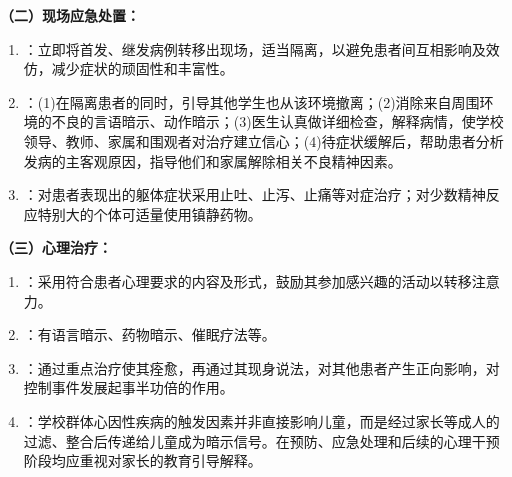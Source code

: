\begin{keybox}
\textbf{（二）现场应急处置：}
\begin{enumerate}[leftmargin=*]
    \item {}：立即将首发、继发病例转移出现场，适当隔离，以避免患者间互相影响及效仿，减少症状的顽固性和丰富性。
    \item {}：(1)在隔离患者的同时，引导其他学生也从该环境撤离；(2)消除来自周围环境的不良的言语暗示、动作暗示；(3)医生认真做详细检查，解释病情，使学校领导、教师、家属和围观者对治疗建立信心；(4)待症状缓解后，帮助患者分析发病的主客观原因，指导他们和家属解除相关不良精神因素。
    \item {}：对患者表现出的躯体症状采用止吐、止泻、止痛等对症治疗；对少数精神反应特别大的个体可适量使用镇静药物。
\end{enumerate}

\textbf{（三）心理治疗：}
\begin{enumerate}[leftmargin=*]
    \item {}：采用符合患者心理要求的内容及形式，鼓励其参加感兴趣的活动以转移注意力。
    \item {}：有语言暗示、药物暗示、催眠疗法等。
    \item {}：通过重点治疗使其痊愈，再通过其现身说法，对其他患者产生正向影响，对控制事件发展起事半功倍的作用。
    \item {}：学校群体心因性疾病的触发因素并非直接影响儿童，而是经过家长等成人的过滤、整合后传递给儿童成为暗示信号。在预防、应急处理和后续的心理干预阶段均应重视对家长的教育引导解释。
\end{enumerate}
\end{keybox}

\newpage
